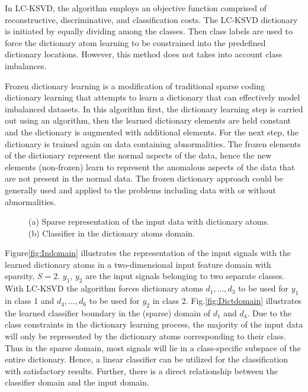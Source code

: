 In LC-KSVD\cite{Jiang2011}, the algorithm employs an objective function comprised of reconstructive, discriminative, and classification costs. The LC-KSVD dictionary is initiated by equally dividing among the classes. Then class labels are used to force the dictionary atom learning to be constrained into the predefined dictionary locations. However, this method does not takes into account class imbalances.

Frozen dictionary learning is a modification of traditional sparse coding dictionary learning that attempts to learn a dictionary that can effectively model imbalanced datasets\cite{Carroll2017}. In this algorithm first, the dictionary learning step is carried out using an algorithm, then the learned dictionary elements are held constant and the dictionary is augmented with additional elements. For the next step, the dictionary is trained again on data containing abnormalities. The frozen elements of the dictionary represent the normal aspects of the data, hence the new elements (non-frozen) learn to represent the anomalous aspects of the data that are not present in the normal data. The frozen dictionary approach could be generally used and applied to the problems including data with or without abnormalities. 

\begin{figure}
\begin{centering}
    \qquad
    
    \caption{(a) Sparse representation of the input data with dictionary atoms. (b) Classifier in the dictionary atoms domain.}\label{fig:image2}
\end{centering}
\end{figure}


Figure\ref{fig:Indomain} illustrates the representation of the input signals with the learned dictionary atoms in a two-dimensional input feature domain with sparsity, $S =2$. $y_1$, $y_2$ are the input signals belonging to two separate classes. With LC-KSVD the algorithm forces dictionary atoms $d_1, \dots , d_3$ to be used for $y_1$ in class 1 and $d_4, \dots , d_6$ to be used for $y_2$ in class 2. Fig.\ref{fig:Dictdomain} illustrates the learned classifier boundary in the (sparse) domain of $d_1$ and $d_4$. Due to the class constraints in the dictionary learning process, the majority of the input data will only be represented by the dictionary atoms corresponding to their class. Thus in the sparse domain, most signals will lie in a class-specific subspace of the entire dictionary. Hence, a linear classifier can be utilized for the classification with satisfactory results. Further, there is a direct relationship between the classifier domain and the input domain. 

